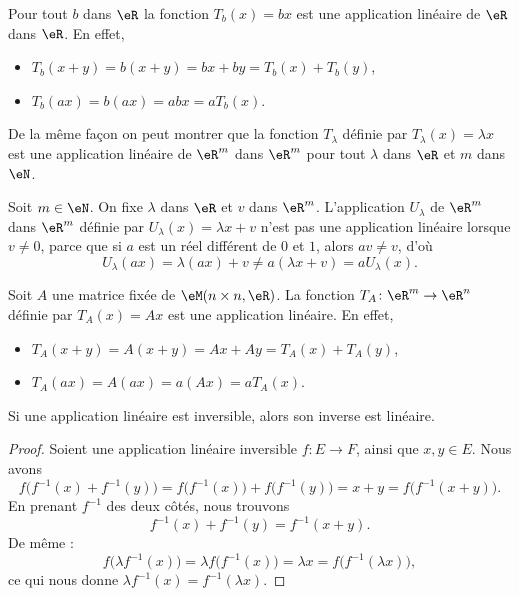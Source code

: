 \begin{example}     \label{EXooMAWMooEaNWpl}
	Pour tout \( b\) dans \( \eR\) la fonction \( T_b(x)= bx\) est une application linéaire de \( \eR\) dans \( \eR\). En effet,
	\begin{itemize}
		\item  \( T_b(x+y)= b(x+y)= bx + by = T_b(x)+T_b(y)\),
		\item \( T_b(ax)=b(ax)= abx = a T_b(x)\).
	\end{itemize}
	De la même façon on peut montrer que la fonction \( T_{\lambda}\) définie par \( T_{\lambda}(x)=\lambda x\) est une application linéaire de \( \eR^m\) dans \( \eR^m\) pour tout \( \lambda\) dans \( \eR\) et \( m\) dans \( \eN\).
\end{example}

\begin{example}     \label{ex_affine}
	Soit \( m\in\eN\). On fixe \( \lambda\) dans \( \eR\) et \( v\) dans \( \eR^m\). L'application \( U_{\lambda}\) de \( \eR^m\) dans \( \eR^m\) définie par \( U_{\lambda}(x)=\lambda x+v\) n'est pas une application linéaire lorsque \( v \neq 0 \), parce que si \( a \) est un réel différent de \(0 \) et \( 1 \), alors \( av \neq v \), d'où
	\[
		U_{\lambda}(ax)=\lambda(ax)+v\neq a(\lambda x+v) =a U_{\lambda}(x).
	\]
\end{example}

\begin{example}     \label{exampleT_A}
	Soit \( A\) une matrice fixée de \( \eM(n\times n, \eR)\). La fonction \( T_A\colon \eR^m\to \eR^n\) définie par \( T_A(x)=Ax\) est une application linéaire. En effet,
	\begin{itemize}
		\item \( T_A(x+y) = A(x+y)= Ax + Ay = T_A(x)+T_A(y)\),
		\item \( T_A(ax)  = A(ax) = a(Ax)   = a T_A(x)\).
	\end{itemize}
\end{example}

\begin{lemma}       \label{LEMooLGEHooVEEoiU}
	Si une application linéaire est inversible, alors son inverse est linéaire.
\end{lemma}

\begin{proof}
	Soient une application linéaire inversible \( f\colon E\to F\), ainsi que \( x,y\in E\). Nous avons
	\begin{equation}
		f\big( f^{-1}(x)+f^{-1}(y) \big)=f\big( f^{-1}(x) \big)+f\big( f^{-1}(y) \big)=x+y=f\big( f^{-1}(x+y) \big).
	\end{equation}
	En prenant \( f^{-1}\) des deux côtés, nous trouvons
	\begin{equation}
		f^{-1}(x)+f^{-1}(y)=f^{-1}(x+y).
	\end{equation}
	De même :
	\begin{equation}
		f\big( \lambda f^{-1}(x) \big)=\lambda f\big( f^{-1}(x) \big)=\lambda x=f\big( f^{-1}(\lambda x) \big),
	\end{equation}
	ce qui nous donne \( \lambda f^{-1}(x)=f^{-1}(\lambda x)\).
\end{proof}


